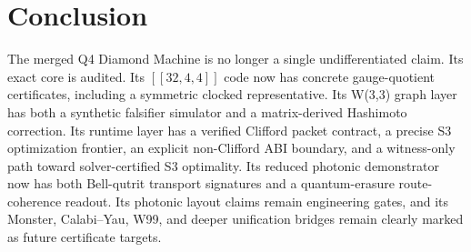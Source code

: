 \documentclass[11pt]{article}
\begin{document}
\section{Conclusion}

The merged Q4 Diamond Machine is no longer a single undifferentiated claim. Its exact core is audited. Its \([[32,4,4]]\) code now has concrete gauge-quotient certificates, including a symmetric clocked representative. Its W(3,3) graph layer has both a synthetic falsifier simulator and a matrix-derived Hashimoto correction. Its runtime layer has a verified Clifford packet contract, a precise S3 optimization frontier, an explicit non-Clifford ABI boundary, and a witness-only path toward solver-certified S3 optimality. Its reduced photonic demonstrator now has both Bell-qutrit transport signatures and a quantum-erasure route-coherence readout. Its photonic layout claims remain engineering gates, and its Monster, Calabi--Yau, W99, and deeper unification bridges remain clearly marked as future certificate targets.
\end{document}
